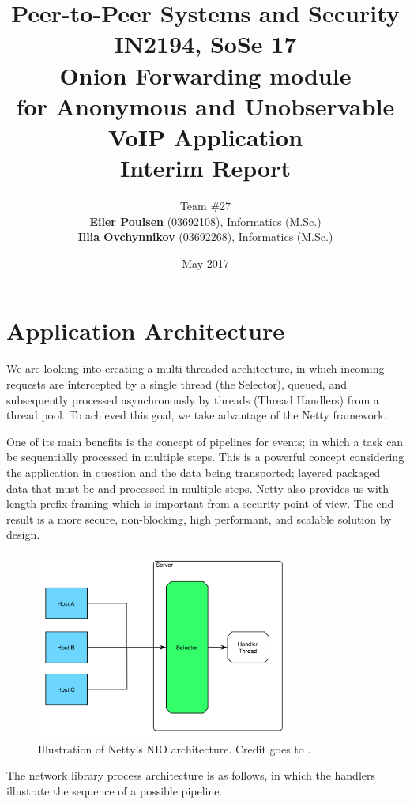 \documentclass{article}
\title{Peer-to-Peer Systems and Security \\
        \large{IN2194, SoSe 17} \\
        \huge{Onion Forwarding module} \\
        \small{for Anonymous and Unobservable VoIP Application} \\
        \bigbreak
        \large{\textbf{Interim Report}}}
\author{Team \#27 \\
\textbf{Eiler Poulsen} (03692108), Informatics (M.Sc.) \\
\textbf{Illia Ovchynnikov} (03692268), Informatics (M.Sc.)}
\date{May 2017}
\begin{document}
\maketitle

\section{Application Architecture}
We are looking into creating a multi-threaded architecture, in which incoming requests are intercepted by a single thread (the Selector), queued, and subsequently processed asynchronously by threads (Thread Handlers) from a thread pool. To achieved this goal, we take advantage of the Netty framework\cite{netty}. 

One of its main benefits is the concept of pipelines for events; in which a task can be sequentially processed in multiple steps. This is a powerful concept considering the application in question and the data being transported; layered packaged data that must be and processed in multiple steps. Netty also provides us with length prefix framing which is important from a security point of view. The end result is a more secure, non-blocking, high performant, and scalable solution by design.

\begin{figure}[H]
\centering
     \includegraphics[width=0.75\textwidth]{arc_img1.png}
      \caption{Illustration of Netty's NIO architecture. Credit goes to \cite{netty}.}
\end{figure}

The network library process architecture is as follows, in which the handlers illustrate the sequence of a possible pipeline.
\end{document}
